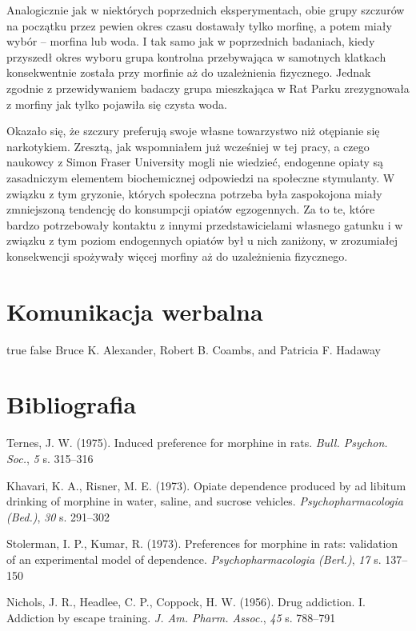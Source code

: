\documentclass[12pt]{article}
\newcommand{\apaartykul}[6]{#1 (#2). #3. \textit{#4}, \textit{#5} s. #6}
\begin{document}
Analogicznie jak w niektórych poprzednich eksperymentach, obie grupy szczurów na początku przez pewien okres czasu dostawały tylko morfinę, a potem miały wybór -- morfina lub woda. I tak samo jak w poprzednich badaniach, kiedy przyszedł okres wyboru grupa kontrolna przebywająca w samotnych klatkach konsekwentnie została przy morfinie aż do uzależnienia fizycznego. Jednak zgodnie z przewidywaniem badaczy grupa mieszkająca w Rat Parku zrezygnowała z morfiny jak tylko pojawiła się czysta woda.

Okazało się, że szczury preferują swoje własne towarzystwo niż otępianie się narkotykiem. Zresztą, jak wspomniałem już wcześniej w tej pracy, a czego naukowcy z Simon Fraser University mogli nie wiedzieć, endogenne opiaty są zasadniczym elementem biochemicznej odpowiedzi na społeczne stymulanty. W związku z tym gryzonie, których społeczna potrzeba była zaspokojona miały zmniejszoną tendencję do konsumpcji opiatów egzogennych. Za to te, które bardzo potrzebowały kontaktu z innymi przedstawicielami własnego gatunku i w związku z tym poziom endogennych opiatów był u nich zaniżony, w zrozumiałej konsekwencji spożywały więcej morfiny aż do uzależnienia fizycznego.

\section{Komunikacja werbalna}

\ifx true false
Bruce K. Alexander, Robert B. Coambs, and Patricia F. Hadaway 
\fi

\pagebreak

\section{Bibliografia}

\apaartykul{Ternes, J. W.}{1975}{Induced preference for morphine in rats}{Bull. Psychon. Soc.}{5}{315--316}

\apaartykul{Khavari, K. A., Risner, M. E.}{1973}{Opiate dependence produced by ad libitum drinking of morphine in water, saline, and sucrose vehicles}{Psychopharmacologia (Bed.)}{30}{291--302}

\apaartykul{Stolerman, I. P., Kumar, R.}{1973}{Preferences for morphine in rats: validation of an experimental model of dependence}{Psychopharmacologia (Berl.)}{17}{137--150}

\apaartykul{Nichols, J. R., Headlee, C. P., Coppock, H. W.}{1956}{Drug addiction. I. Addiction by escape training}{J. Am. Pharm. Assoc.}{45}{788--791}
\end{document}
